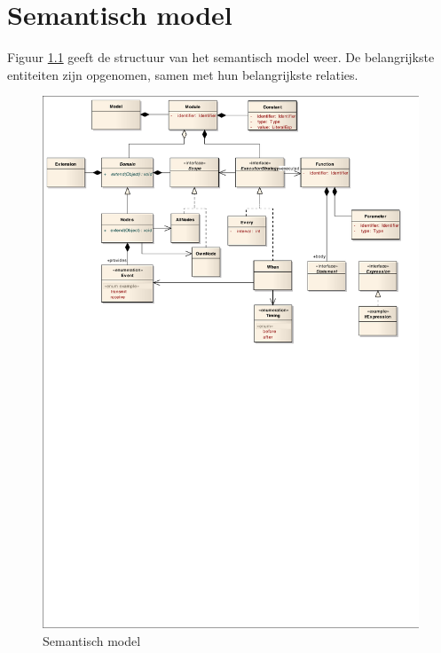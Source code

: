 
\chapter{Semantisch model}
\label{appendix:semantic-model}

Figuur \ref{fig:arch-semantic-model} geeft de structuur van het semantisch
model weer. De belangrijkste entiteiten zijn opgenomen, samen met hun
belangrijkste relaties.

\vspace{1cm}

\begin{figure}[ht]
  \centering
  \includegraphics[width=\linewidth]{resources/semantic.pdf}
  \caption{Semantisch model}
  \label{fig:arch-semantic-model}
\end{figure}
